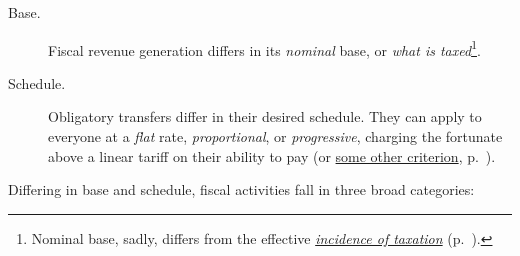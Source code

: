 
\begin{description}
	\item[Base.]  \label{itm:base} Fiscal revenue generation differs in its \emph{nominal} base, or \emph{what is taxed}\footnote{
		Nominal base, sadly, differs from the effective \hyperref[sec:tax-incidence]{\emph{incidence of taxation}} (p.~\pageref{sec:tax-incidence}).}.
	\item[Schedule.]  \label{itm:schedule} Obligatory transfers differ in their desired schedule. They can apply to everyone at a \emph{flat} rate, \emph{proportional}, or \emph{progressive}, charging the fortunate above a linear tariff on their ability to pay (or \hyperref[sec:tax-equity]{some other criterion}, p.~\pageref{sec:tax-equity}). 
\end{description}

 

Differing in base and schedule, fiscal activities fall in three broad categories:

